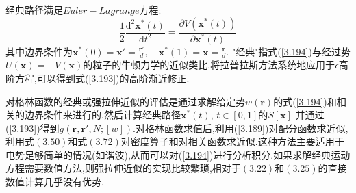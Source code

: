 经典路径满足$Euler-Lagrange$方程:
\begin{equation}
\frac{1}{2}\frac{\mathrm{d}^2 \mathbf{x}^*(t)}{\mathrm{d}t^2} = \frac{\partial V(\mathbf{x}^*(t))}{\partial \mathbf{x}^*(t)} \label{3.194}
\end{equation}
其中边界条件为$\mathbf{x}^*(0) = \mathbf{x}'= \frac{\mathbf{r}'}{d},\quad \mathbf{x}^*(1) = \mathbf{x} = \frac{\mathbf{r}}{d}$.
"经典"指式(\ref{3.194})与经过势$U(\mathbf{x})= -V(\mathbf{x})$的粒子的牛顿力学的近似类比.将拉普拉斯方法系统地应用于$\epsilon$高阶方程,可以得到式(\ref{3.193})的高阶渐近修正.

对格林函数的经典或强拉伸近似的评估是通过求解给定势$w(\mathbf{r})$的式(\ref{3.194})和相关的边界条件来进行的.然后计算经典路径$\mathbf{x}^*(t),\, t\in [0,1]$的$S[\mathbf{x}]$
并通过(\ref{3.193})得到$g(\mathbf{r},\mathbf{r}',N;[w])$.对格林函数求值后,利用(\ref{3.189})对配分函数求近似,利用式$(3.50)$和式$(3.72)$对密度算子和对相关函数求近似.这种方法主要适用于电势足够简单的情况(如谐波),从而可以对(\ref{3.194})进行分析积分.如果求解经典运动方程需要数值方法,则强拉伸近似的实现比较繁琐,相对于$(3.22)$和$(3.25)$的直接数值计算几乎没有优势.




